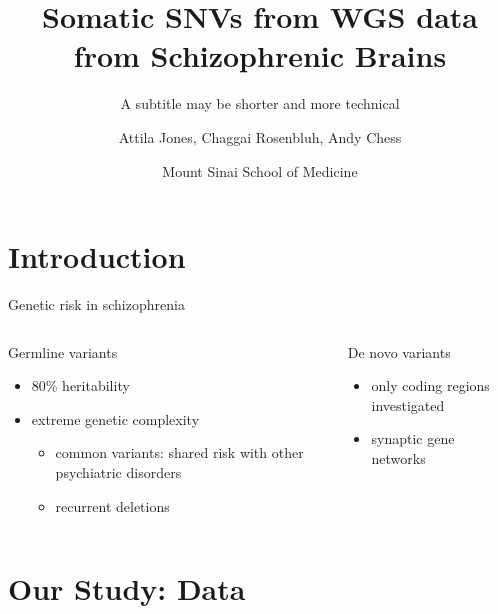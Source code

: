\documentclass{beamer}
\title{Somatic SNVs from WGS data from Schizophrenic Brains}
\subtitle{A subtitle may be shorter and more technical}
\author{Attila Jones, Chaggai Rosenbluh, Andy Chess}
\date{Mount Sinai School of Medicine}
\begin{document}
\maketitle

\section{Introduction}

\begin{frame}{Genetic risk in schizophrenia}
\begin{columns}[t]
\begin{column}{0.5\textwidth}
Germline variants
\begin{itemize}
\item 80\% heritability
\item extreme genetic complexity
\begin{itemize}
\item common variants: shared risk with other psychiatric disorders
\item recurrent deletions%
\end{itemize}
\end{itemize}
\end{column}
\begin{column}{0.5\textwidth}
De novo variants
\begin{itemize}
	\item only coding regions investigated%
        \item synaptic gene networks
\end{itemize}
\end{column}
\end{columns}
\end{frame}

\section{Our Study: Data}
\end{document}
